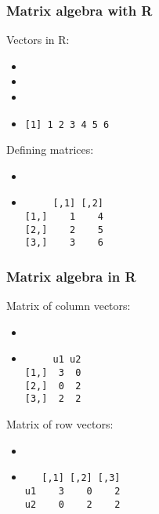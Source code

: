 \begin{frame}[containsverbatim]
  \frametitle{Matrix algebra with R}

  Vectors in R:
  \begin{itemize}
  \item {}
  \item {}
  \item {}
  \item {}
    \begin{footnotesize}
\begin{verbatim}
[1] 1 2 3 4 5 6
\end{verbatim}
    \end{footnotesize}
  \end{itemize}
   
  \gap
  Defining matrices:
  \begin{itemize}
  \item {}
  \item {}
    \begin{footnotesize}
\begin{verbatim}
     [,1] [,2]
[1,]    1    4
[2,]    2    5
[3,]    3    6
\end{verbatim}
    \end{footnotesize}
  \end{itemize}
\end{frame}

\begin{frame}[containsverbatim]
  \frametitle{Matrix algebra in R}
  
  Matrix of column vectors:
  \begin{itemize}
  \item {}
  \item {}
    \begin{footnotesize}
\begin{verbatim}
     u1 u2
[1,]  3  0
[2,]  0  2
[3,]  2  2
\end{verbatim}
    \end{footnotesize}
  \end{itemize}

  \gap
  Matrix of row vectors:
  \begin{itemize}
  \item {}
  \item {}
    \begin{footnotesize}
\begin{verbatim}
   [,1] [,2] [,3]
u1    3    0    2
u2    0    2    2
\end{verbatim}
    \end{footnotesize}
  \end{itemize}
\end{frame}

